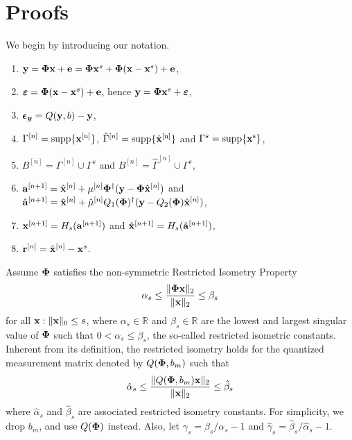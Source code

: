 \documentclass{article}
\begin{document}
\section{Proofs}
We begin by introducing our notation.
\begin{enumerate}
    \item ${\bf y} = {\bf \Phi} {\bf x} + {\bf e} = {\bf \Phi} {\bf x}^s + {\bf \Phi}({\bf x}-{\bf x}^s) + {\bf e}$,
    \item $\boldsymbol{\varepsilon} = {\bf \Phi}({\bf x}-{\bf x}^s) + {\bf e}$, hence ${\bf y} = {\bf \Phi} {\bf x}^s + \boldsymbol{\varepsilon}$,
    \item $\boldsymbol{\epsilon_y} = Q({\bf y},b) - {\bf y}$,
    \item $\Gamma^{[n]} = \rm{supp}\{{\bf x}^{[n]} \}$, $\hat{\Gamma}^{[n]} = \rm{supp}\{\hat{{\bf x}}^{[n]} \}$ and $\Gamma^{s} = \rm{supp}\{{\bf x}^{s} \}$,
    \item $B^{[n]} = \Gamma^{[n]} \cup \Gamma^{s}$ and $B^{[n]} = \hat{\Gamma}^{[n]} \cup \Gamma^{s}$,
    \item ${\bf a}^{[n+1]} = \hat{{\bf x}}^{[n]} + \mu^{[n]}{\bf \Phi}^{\dag}({\bf y} - {\bf \Phi}\hat{{\bf x}}^{[n]})$ and $\hat{{\bf a}}^{[n+1]} = \hat{{\bf x}}^{[n]} + \hat{\mu}^{[n]}Q_{1}({\bf \Phi})^{\dag}({\bf y} - Q_2({\bf \Phi})\hat{{\bf x}}^{[n]})$,
    \item ${\bf x}^{[n+1]} = H_s({\bf a}^{[n+1]})$ and $\hat{{\bf x}}^{[n+1]} = H_s(\hat{{\bf a}}^{[n+1]})$,
    \item ${\bf r}^{[n]} = \hat{{\bf x}}^{[n]}-{\bf x}^s$.
\end{enumerate}
Assume $\mathbf{\bf \Phi}$ satisfies the non-symmetric Restricted Isometry Property 
\begin{equation}\label{rip}
\alpha_{s} \leq \frac{\|{\bf {\bf \Phi}} {\bf x}\|_2}{\|{\bf x}\|_2} \leq \beta_{s}
\end{equation}
for all ${\bf x}: \|{\bf x}\|_0 \leq s$, where $\alpha_s\in \mathbb{R}$ and $\beta_s \in \mathbb{R}$ are the lowest and largest singular value of ${\bf \Phi}$ such that $0<\alpha_s\leq \beta_s$, the so-called restricted isometric constants. Inherent from its definition, the restricted isometry holds for the quantized measurement matrix denoted by $Q({\bf {\bf \Phi}}, b_m)$ such that
\begin{equation}\label{rip_lowprecision}
\hat{\alpha}_{s} \leq \frac{\|Q({\bf {\bf \Phi}}, b_m) {\bf x}\|_2}{\|{\bf x}\|_2} \leq \hat{\beta}_{s}
\end{equation}
where $\hat{\alpha}_{s}$ and $\hat{\beta}_{s}$ are associated restricted isometry constants. For simplicity, we drop $b_m$, and use $Q({\bf {\bf \Phi}})$ instead. Also, let $\gamma_s=\beta_s/\alpha_s-1$ and $\hat{\gamma}_s=\hat{\beta}_s/\hat{\alpha}_s-1$.
\end{document}
